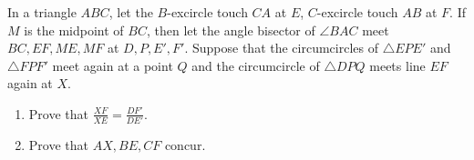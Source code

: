 In a triangle $ABC$, let the $B$-excircle touch $CA$ at $E$, $C$-excircle touch $AB$ at $F$. If $M$ is the midpoint of $BC$, then let the angle bisector of $\angle{BAC}$ meet $BC,EF,ME,MF$ at $D,P,E',F'$. Suppose that the circumcircles of $\triangle{EPE'}$ and $\triangle{FPF'}$ meet again at a point $Q$ and the circumcircle of $\triangle{DPQ}$ meets line $EF$ again at $X$.
\begin{enumerate}[label=(\arabic*)]
	\item Prove that $\frac{XF}{XE}=\frac{DF'}{DE'}$.
	\item Prove that $AX,BE,CF$ concur.
\end{enumerate}

